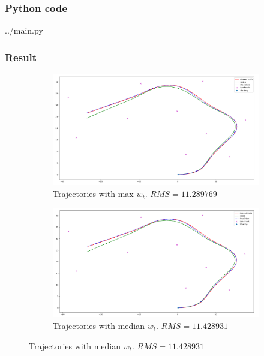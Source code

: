\documentclass{article}
\begin{document}
\subsubsection{Python code}

{../main.py}

\subsubsection{Result} 
\begin{figure}[h!]
\centering
\begin{subfigure}[b]{0.8\linewidth}
	\includegraphics[width=\textwidth]{../max.png}
	\caption{Trajectories with max $w_t$. $RMS = 11.289769$}\label{fig:image-1}
\end{subfigure}
\begin{subfigure}[b]{0.8\linewidth}
	\includegraphics[width=\textwidth]{../median.png}
	\caption{Trajectories with median $w_t$. $RMS = 11.428931$}\label{fig:image-2}
\end{subfigure}

\end{figure}
\end{document}
